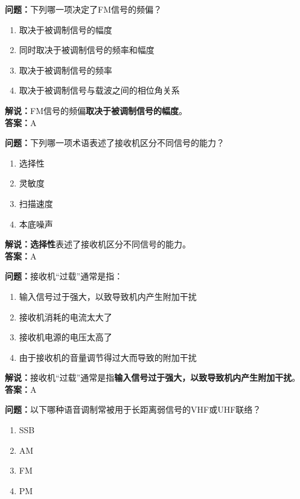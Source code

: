 \textbf{问题：}下列哪一项决定了FM信号的频偏？

\begin{enumerate}[label=\Alph*), leftmargin=1cm]
	\item 取决于被调制信号的幅度
	\item 同时取决于被调制信号的频率和幅度
	\item 取决于被调制信号的频率
	\item 取决于被调制信号与载波之间的相位角关系
\end{enumerate}

\textbf{解说：}FM信号的频偏\textbf{取决于被调制信号的幅度}。\\\textbf{答案：}A%



\textbf{问题：}下列哪一项术语表述了接收机区分不同信号的能力？

\begin{enumerate}[label=\Alph*), leftmargin=1cm]
	\item 选择性
	\item 灵敏度
	\item 扫描速度
	\item 本底噪声
\end{enumerate}

\textbf{解说：}\textbf{选择性}表述了接收机区分不同信号的能力。\\\textbf{答案：}A%



\textbf{问题：}接收机“过载”通常是指：

\begin{enumerate}[label=\Alph*), leftmargin=1cm]
	\item 输入信号过于强大，以致导致机内产生附加干扰
	\item 接收机消耗的电流太大了
	\item 接收机电源的电压太高了
	\item 由于接收机的音量调节得过大而导致的附加干扰
\end{enumerate}

\textbf{解说：}接收机“过载”通常是指\textbf{输入信号过于强大，以致导致机内产生附加干扰}。\\\textbf{答案：}A%



\textbf{问题：}以下哪种语音调制常被用于长距离弱信号的VHF或UHF联络？

\begin{enumerate}[label=\Alph*), leftmargin=1cm]
	\item SSB
	\item AM
	\item FM
	\item PM
\end{enumerate}

